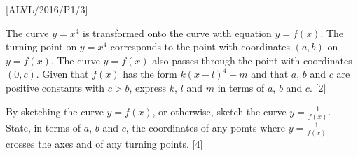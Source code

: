 \item {[}ALVL/2016/P1/3{]}

The curve $y=x^{4}$ is transformed onto the curve with equation $y=f\left(x\right)$.
The turning point on $y=x^{4}$ corresponds to the point with coordinates
$\left(a,b\right)$ on $y=f\left(x\right)$. The curve $y=f\left(x\right)$
also passes through the point with coordinates $\left(0,c\right)$.
Given that $f\left(x\right)$ has the form $k\left(x-l\right)^{4}+m$
and that $a$, $b$ and $c$ are positive constants with $c>b$, express
$k$, $l$ and $m$ in terms of $a$, $b$ and $c$. \hfill{} {[}2{]}

By sketching the curve $y=f\left(x\right)$, or otherwise, sketch
the curve $y=\frac{1}{f\left(x\right)}$. State, in terms of $a$,
$b$ and $c$, the coordinates of any pomts where $y=\frac{1}{f\left(x\right)}$
crosses the axes and of any turning points. \hfill{}{[}4{]}
